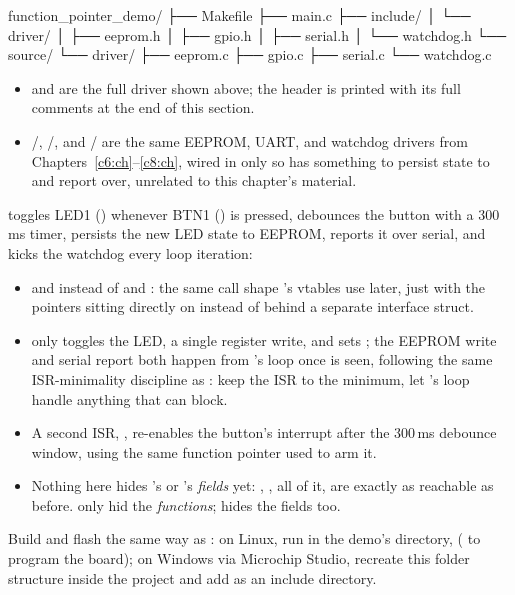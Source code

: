 \begin{console}
function_pointer_demo/
├── Makefile
├── main.c
├── include/
│   └── driver/
│       ├── eeprom.h
│       ├── gpio.h
│       ├── serial.h
│       └── watchdog.h
└── source/
    └── driver/
        ├── eeprom.c
        ├── gpio.c
        ├── serial.c
        └── watchdog.c
\end{console}

\begin{itemize}
  \item {} and  are the full driver shown above; the header
    is printed with its full comments at the end of this section.
  \item {}/, /, and
    / are the same EEPROM, UART, and watchdog drivers from
    Chapters~\ref{c6:ch}--\ref{c8:ch}, wired in only so  has something to persist
    state to and report over, unrelated to this chapter's material.
\end{itemize}
 toggles LED1 () whenever BTN1 () is pressed, debounces the button
with a 300\,ms timer, persists the new LED state to EEPROM, reports it over serial, and kicks the
watchdog every loop iteration:


\begin{itemize}
  \item {} and  instead of
    \allowbreak{} and : the same
    call shape
    's vtables use later, just with the pointers sitting directly on 
    instead of behind a separate interface struct.
  \item {} only toggles the LED, a single register write, and sets
    ; the EEPROM write and serial report both happen from 's loop
    once  is seen, following the same ISR-minimality discipline as
    : keep the ISR to the minimum, let 's loop handle anything that
    can block.
  \item A second ISR, , re-enables the button's interrupt after the 300\,ms
    debounce window, using the same  function pointer  used to arm
    it.
  \item Nothing here hides 's or 's \emph{fields} yet: ,
    , all of it, are exactly as reachable as before.  only hid the
    \emph{functions};  hides the fields too.
\end{itemize}
Build and flash the same way as : on Linux, run  in the demo's
directory,  ( to program the board); on
Windows via Microchip Studio, recreate this folder structure inside the project and add
 as an include directory.

